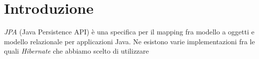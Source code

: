 \section{Introduzione}
\textsl{JPA} (Java Persistence API) è una specifica per il mapping fra modello a oggetti e modello relazionale per applicazioni Java.
Ne esistono varie implementazioni fra le quali \textsl{Hibernate} che abbiamo scelto di utilizzare